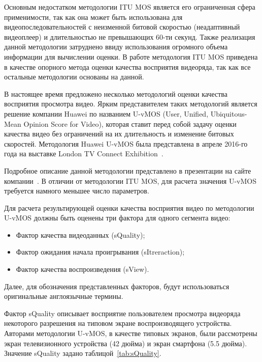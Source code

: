 Основным недостатком методологии ITU MOS является его ограниченная сфера применимости, так как она может быть использована для видеопоследовательностей с неизменной битовой скоростью (неадаптивный видеоплеер) и длительностью не превышающих 60-ти секунд. Также реализация данной методологии затруднено ввиду использования огромного объема информации для вычислении оценки. В работе методология ITU MOS приведена в качестве опорного метода оценки качества восприятия видеоряда, так как все остальные методологии основаны на данной.

В настоящее время предложено несколько методологий оценки качества восприятия просмотра видео. Ярким представителем таких методологий является решение компании Huawei по названием U-vMOS (User, Unified, Ubiquitous-Mean Opinion Score for Video), которая ставит перед собой задачу оценки качества видео без ограничений на их длительность и изменение битовых скоростей. Методология Huawei U-vMOS была представлена в апреле 2016-го года на выставке London TV Connect Exhibition~\cite{UvMOSWhitePaper}.

Подробное описание данной методологии представлено в презентации на сайте компании~\cite{UvMOSPresentation}. В отличии от методологии ITU MOS, для расчета значения U-vMOS требуется намного меньшее число параметров.

Для расчета результирующей оценки качества восприятия видео по методологии U-vMOS должны быть оценены три фактора для одного сегмента видео:
\begin{itemize}
  \item Фактор качества видеоданных (sQuality);
  \item Фактор ожидания начала проигрывания (sItreraction);
  \item Фактор качества воспроизведения (sView).
\end{itemize}
Далее, для обозначения представленных факторов, будут использоваться оригинальные англоязычные термины.

Фактор sQuality описывает восприятие пользователем просмотра видеоряда некоторого разрешения на типовом экране воспроизводящего устройства. Авторами методологии U-vMOS, в качестве типовых экранов, были рассмотрены экран телевизионного устройства (42 дюйма) и экран смартфона (5.5 дюйма). Значение sQuality задано таблицой~\ref{tab:sQuality}.

